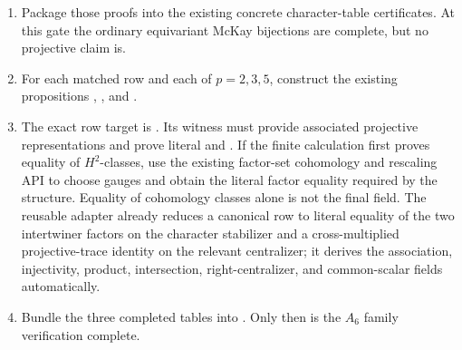 \documentclass[11pt]{article}
\begin{document}
\begin{enumerate}[label=\textbf{P2.A6.\arabic*.},leftmargin=*]
  the two corrected local bridges; prove those local bridges next.
  At \(p=3\), do \emph{not} target the existing display-order identity:
  the audited generator permutations do not intertwine it.  Degree and
  central exponent now isolate two singleton positions and five pairs.
  Two invariant-safe ambient orientations are recorded and differ only by
  the \(\mathrm{row24}/\mathrm{row25}\) pair.  Exact trace calculations
  close every remaining value pair: the first generator swaps that final
  pair and the second fixes it.  Thus both complete ambient bridges hold
  for both orientations.  This verifies their semantic equivariance but
  does not independently identify CTblLib's stored order.  A proposed
  invariant-safe local order is now recovered with linear frequencies
  \(0,4,2,6,1,3,5,7\) followed by the four lexicographic degree-four
  coordinates; it matches every audited degree and central sign.  Explicit
  Schur corrections determine the first generator on \(Z,X\) and the
  second on \(Z\), and each full local bridge is equivalent to its eleven
  nontrivial position equations.  Transport these calculations through
  the fixed-Sylow equivalence, evaluate the remaining coordinate
  characters, and then prove full-stabilizer equivariance for the
  corrected matching.  Retain
   only as a diagnostic
  proposition unless those audited actions are disproved.
  \item Package those proofs into the existing concrete character-table
  certificates.  At this gate the ordinary equivariant McKay bijections
  are complete, but no projective claim is.
  \item For each matched row and each of \(p=2,3,5\), construct the existing
  propositions
  ,
  , and
  .
  \item The exact row target is
  .  Its witness must provide
  associated projective representations and prove literal
   and
  .  If the finite
  calculation first proves equality of \(H^2\)-classes, use the existing
  factor-set cohomology and rescaling API to choose gauges and obtain the
  literal factor equality required by the structure.  Equality of
  cohomology classes alone is not the final field.
  The reusable
  adapter already reduces a canonical row to literal equality of the two
  intertwiner factors on the character stabilizer and a cross-multiplied
  projective-trace identity on the relevant centralizer; it derives the
  association, injectivity, product, intersection, right-centralizer, and
  common-scalar fields automatically.
  \item Bundle the three completed tables into
  .  Only then is the
  \(A_6\) family verification complete.
\end{enumerate}
\end{document}
